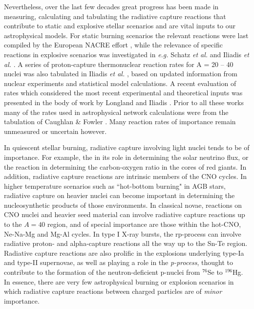 Nevertheless, over the last few decades great progress has been made in measuring, calculating and tabulating the radiative capture reactions that contribute to static and explosive stellar scenarios and are vital inputs to our astrophysical models.  For static burning scenarios the relevant reactions were last compiled by the European NACRE effort \cite{angu99}, while the relevance of specific reactions in explosive scenarios was investigated in {\it e.g.} Schatz {\it et al.} \cite{scha98} and Iliadis {\it et al.} \cite{ilia02}. A series of proton-capture thermonuclear reaction rates for A = 20 -- 40 nuclei was also tabulated in Iliadis {\it et al.} \cite{ilia01}, based on updated information from nuclear experiments and statistical model calculations. 
A recent evaluation of rates which considered the most recent experimental and theoretical inputs was presented in the body of work by Longland and Iliadis \cite{Lon10,Ili10a,Ili10b,Ili10c}.
Prior to all these works many of the rates used in astrophysical network calculations were from the tabulation of Caughlan \& Fowler \cite{caug88}. Many reaction rates of importance remain unmeasured or uncertain however.

In quiescent stellar burning, radiative capture involving light nuclei tends to be of importance. For example, the  in its role in determining the solar neutrino flux, or the  reaction in determining the carbon-oxygen ratio in the cores of red giants. In addition, radiative capture reactions are intrinsic members of the CNO cycles. 
In higher temperature scenarios such as ``hot-bottom burning" in AGB stars, radiative capture on heavier nuclei can become important in determining the nucleosynthetic products of those environments. 
In classical novae, reactions on CNO nuclei and heavier seed material can involve radiative capture reactions up to the $A=40$ region, and of special importance are those within the hot-CNO, Ne-Na-Mg and Mg-Al cycles. In type I X-ray bursts, the rp-process can involve radiative proton- and alpha-capture reactions all the way up to the Sn-Te region. 
Radiative capture reactions are also prolific in the explosions underlying type-Ia and type-II supernovae, as well as playing a role in the {\em p-process}, thought to contribute to the formation of the neutron-deficient p-nuclei from  $^{76}$Se to $^{196}$Hg. In essence, there are very few astrophysical burning or explosion scenarios in which radiative capture reactions between charged particles are of {\em minor} importance.   

